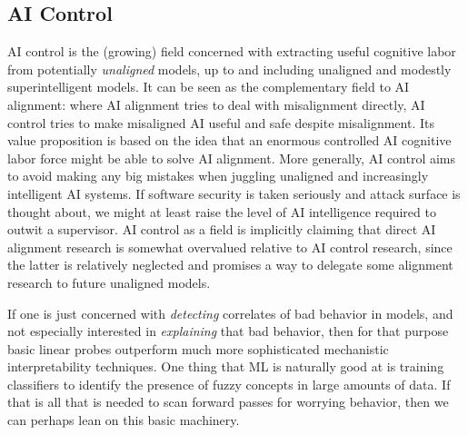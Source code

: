 \subsection{AI Control}
AI control \cite{greenblatt2024aicontrol} is the (growing) field concerned with
extracting useful cognitive labor from potentially \emph{unaligned} models, up
to and including unaligned and modestly superintelligent models. It can be seen
as the complementary field to AI alignment: where AI alignment tries to deal
with misalignment directly, AI control tries to make misaligned AI useful and
safe despite misalignment. Its value proposition is based on the idea that an
enormous controlled AI cognitive labor force might be able to solve AI
alignment. More generally, AI control aims to avoid making any big mistakes
when juggling unaligned and increasingly intelligent AI systems. If software
security is taken seriously and attack surface is thought about, we might at
least raise the level of AI intelligence required to outwit a supervisor. AI
control as a field is implicitly claiming that direct AI alignment research is
somewhat overvalued relative to AI control research, since the latter is
relatively neglected and promises a way to delegate some alignment research to
future unaligned models.

If one is just concerned with \emph{detecting} correlates of bad behavior in
models, and not especially interested in \emph{explaining} that bad behavior,
then for that purpose basic linear probes outperform much more sophisticated
mechanistic interpretability techniques. One thing that ML is naturally good at
is training classifiers to identify the presence of fuzzy concepts in large
amounts of data. If that is all that is needed to scan forward passes for
worrying behavior, then we can perhaps lean on this basic machinery.

